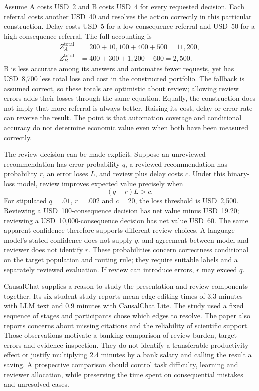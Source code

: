Assume A costs USD~2 and B costs USD~4 for every requested decision. Each
referral costs another USD~40 and resolves the action correctly in this
particular construction. Delay costs USD~5 for a low-consequence referral and
USD~50 for a high-consequence referral. The full accounting is
\[
 \begin{aligned}
 Z_A^{\mathrm{total}}&=200+10{,}100+400+500=11{,}200,\\
 Z_B^{\mathrm{total}}&=400+300+1{,}200+600=2{,}500.
 \end{aligned}
\]
B is less accurate among its answers and automates fewer requests, yet has
USD~8,700 less total loss and cost in the constructed portfolio. The fallback
is assumed correct, so these totals are optimistic about review; allowing
review errors adds their losses through the same equation. Equally, the
construction does not imply that more referral is always better. Raising its
cost, delay or error rate can reverse the result. The point is that automation
coverage and conditional accuracy do not determine economic value even when
both have been measured correctly. \citep{exec14_l8_economics}

The review decision can be made explicit. Suppose an unreviewed recommendation
has error probability $q$, a reviewed recommendation has probability $r$, an
error loses $L$, and review plus delay costs $c$. Under this binary-loss model,
review improves expected value precisely when
\[
 (q-r)L>c.
\]
For stipulated $q=.01$, $r=.002$ and $c=20$, the loss threshold is USD~2,500.
Reviewing a USD~100-consequence decision has net value minus USD~19.20;
reviewing a USD~10,000-consequence decision has net value USD~60. The same
apparent confidence therefore supports different review choices. A language
model's stated confidence does not supply $q$, and agreement between model
and reviewer does not identify $r$. These probabilities concern correctness
conditional on the target population and routing rule; they require suitable
labels and a separately reviewed evaluation. If review can introduce errors,
$r$ may exceed $q$. \citep{exec14_l8_economics}

CausalChat supplies a reason to study the presentation and review components
together. Its six-student study reports mean edge-editing times of 3.3 minutes
with LLM text and 0.9 minutes with CausalChat Lite. The study used a fixed
sequence of stages and participants chose which edges to resolve. The paper
also reports concerns about missing citations and the reliability of scientific
support. Those observations motivate a banking comparison of review burden,
target errors and evidence inspection. They do not identify a transferable
productivity effect or justify multiplying 2.4 minutes by a bank salary and
calling the result a saving. A prospective comparison should control task
difficulty, learning and reviewer allocation, while preserving the time spent
on consequential mistakes and unresolved cases. \citep{v12_la_2410_14146}

